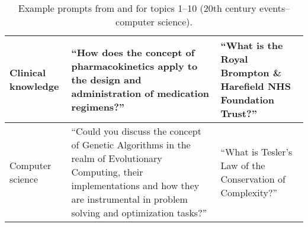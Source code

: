 \begin{table}[th]
\begin{tabular}{m{25mm}  m{45mm}  m{45mm}}
        \midrule
        Clinical knowledge & ``How does the concept of pharmacokinetics apply to the design and administration of medication regimens?'' & ``What is the Royal Brompton \& Harefield NHS Foundation Trust?'' \\
        \midrule
        Computer science & ``Could you discuss the concept of Genetic Algorithms in the realm of Evolutionary Computing, their implementations and how they are instrumental in problem solving and optimization tasks?'' & ``What is Tesler's Law of the Conservation of Complexity?'' \\
        \bottomrule
    \end{tabular}
    \caption{
    Example prompts from \longfactconcepts{} and \longfactobjects{} for topics 1--10 (20th century events--computer science).
    }
    \label{tab:longfact-example-prompts-1}
\end{table}

